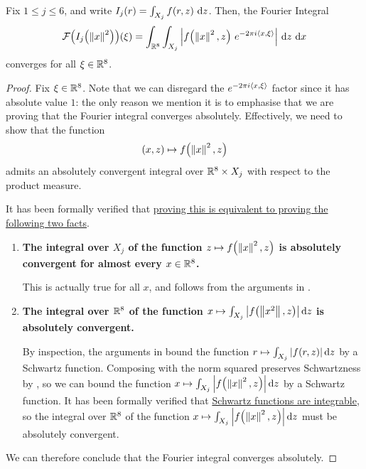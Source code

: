 \begin{boxproposition}\label{Ch4:Prop:FourierIntegralConvergence_Ij}
    Fix $1 \leq j \leq 6$, and write $I_j(r) = \int_{X_j} f(r, z) \, \operatorname{d}\!{z}$. Then, the Fourier Integral
    \begin{align*}
        \mathcal{F}\!\left( I_j\!\left( \left\lVert x \right\rVert^2 \right) \right)\!\left( \xi \right) = \int_{\mathbb{R}^8} \int_{X_j} \left\lvert f\!\left( \left\lVert x \right\rVert^2, z \right) \, e^{-2 \pi i \left\langle x, \xi \right\rangle} \right\rvert \, \operatorname{d}\!{z} \, \operatorname{d}\!{x}
    \end{align*}
    converges for all $\xi \in \mathbb{R}^8$.
\end{boxproposition}
\begin{proof}
    Fix $\xi \in \mathbb{R}^8$. Note that we can disregard the $e^{-2 \pi i \left\langle x, \xi \right\rangle}$ factor since it has absolute value $1$: the only reason we mention it is to emphasise that we are proving that the Fourier integral converges absolutely. Effectively, we need to show that the function
    \begin{align*}
        (x, z) \mapsto f\!\left( \left\lVert x \right\rVert^2, z \right)
    \end{align*}
    admits an absolutely convergent integral over $\mathbb{R}^8 \times X_j$ with respect to the product measure.
    
    It has been formally verified that \href{https://github.com/leanprover-community/mathlib4/blob/5a2eaa85c555c4263e15928cef249cbaad2eb2d2/Mathlib/MeasureTheory/Integral/Prod.lean#L222-L238}{proving this is equivalent to proving the following two facts}.

    \begin{enumerate}
        \item \textbf{The integral over $X_j$ of the function $z \mapsto f\!\left( \left\lVert x \right\rVert^2, z \right)$ is absolutely convergent for almost every $x \in \mathbb{R}^8$.}
        
        This is actually true for all $x$, and follows from the arguments in .
        
        \item \textbf{The integral over $\mathbb{R}^8$ of the function $x 
        \mapsto \int_{X_j} \left\lvert f\!\left( \left\lVert x^2 \right\rVert, z \right) \right\rvert \operatorname{d}\!{z}$ is absolutely convergent.}
        
        By inspection, the arguments in  bound the function $r \mapsto \int_{X_j} \left\lvert f\!\left( r, z \right) \right\rvert \operatorname{d}\!{z}$ by a Schwartz function. Composing with the norm squared preserves Schwartzness by , so we can bound the function $x \mapsto \int_{X_j} \left\lvert f\!\left( \left\lVert x \right\rVert^2, z \right) \right\rvert \operatorname{d}\!{z}$ by a Schwartz function. It has been formally verified that \href{https://github.com/leanprover-community/mathlib4/blob/5a2eaa85c555c4263e15928cef249cbaad2eb2d2/Mathlib/Analysis/Distribution/SchwartzSpace.lean#L1095-L1097}{Schwartz functions are integrable}, so the integral over $\mathbb{R}^8$ of the function $x \mapsto \int_{X_j} \left\lvert f\!\left( \left\lVert x \right\rVert^2, z \right) \right\rvert \operatorname{d}\!{z}$ must be absolutely convergent.
    \end{enumerate}
We can therefore conclude that the Fourier integral converges absolutely.
\end{proof}

